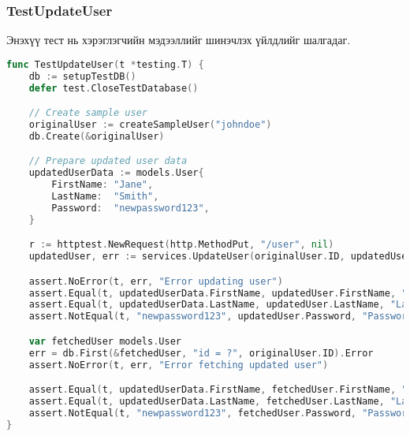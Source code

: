 \subsubsection{TestUpdateUser}

Энэхүү тест нь хэрэглэгчийн мэдээллийг шинэчлэх үйлдлийг шалгадаг.

\begin{lstlisting}[language=Go, caption=Test Update User Function, frame=single]
func TestUpdateUser(t *testing.T) {
    db := setupTestDB()
    defer test.CloseTestDatabase()

    // Create sample user
    originalUser := createSampleUser("johndoe")
    db.Create(&originalUser)

    // Prepare updated user data
    updatedUserData := models.User{
        FirstName: "Jane",
        LastName:  "Smith",
        Password:  "newpassword123",
    }

    r := httptest.NewRequest(http.MethodPut, "/user", nil)
    updatedUser, err := services.UpdateUser(originalUser.ID, updatedUserData, r)

    assert.NoError(t, err, "Error updating user")
    assert.Equal(t, updatedUserData.FirstName, updatedUser.FirstName, "First name mismatch")
    assert.Equal(t, updatedUserData.LastName, updatedUser.LastName, "Last name mismatch")
    assert.NotEqual(t, "newpassword123", updatedUser.Password, "Password should be hashed")

    var fetchedUser models.User
    err = db.First(&fetchedUser, "id = ?", originalUser.ID).Error
    assert.NoError(t, err, "Error fetching updated user")

    assert.Equal(t, updatedUserData.FirstName, fetchedUser.FirstName, "First name mismatch in database")
    assert.Equal(t, updatedUserData.LastName, fetchedUser.LastName, "Last name mismatch in database")
    assert.NotEqual(t, "newpassword123", fetchedUser.Password, "Password should be hashed in database")
}
\end{lstlisting}
\pagebreak
